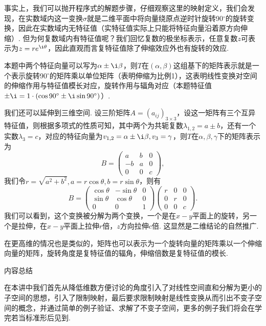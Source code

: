 事实上，我们可以抛开程序式的解题步骤，仔细观察这里的映射定义，我们会发现，在实数域内这一变换$\sigma$就是二维平面中将向量绕原点逆时针旋转90$^\circ$的旋转变换，因此在实数域内无特征值（实特征值实际上只能将特征向量沿着原方向伸缩）. 但为何复数域内有特征值呢？我们回忆复数的极坐标表示，任意复数$z$可表示为$z=re^{\i\theta}$，因此直观而言复特征值除了伸缩效应外也有旋转的效应.

本题中两个特征向量可以写为$\alpha\pm \i\beta$，则$T$在$(\alpha,\beta)$这组基下的矩阵表示就是一个表示旋转90$^\circ$的矩阵乘以单位矩阵（表明伸缩为比例1），这表明线性变换对空间的伸缩作用与特征值模长对应，旋转作用与辐角对应（本题特征值$\pm \i=1\cdot(\cos 90^\circ\pm \i\sin 90^\circ)$）.

我们还可以延伸到三维空间. 设三阶矩阵$A=(a_{ij})_{3\times 3}$，设这一矩阵有三个互异特征值，则根据多项式的性质可知，其中两个为共轭复数$\lambda_{1,2}=a\pm b$，还有一个实数$\lambda_3=c$，对应的特征向量为$v_{1,2}=\alpha\pm \i\beta,v_3=\gamma$，则$T$在$\alpha,\beta,\gamma$下的矩阵表示为
\[ B=\begin{pmatrix}
        a & b & 0 \\ -b & a & 0 \\ 0 & 0 & c
    \end{pmatrix}, \]
我们令$r=\sqrt{a^2+b^2},a=r\cos\theta,b=r\sin\theta$，则有
\[ B=\begin{pmatrix}
        \cos\theta & -\sin\theta & 0 \\ \sin\theta & \cos\theta & 0 \\ 0 & 0 & 1
    \end{pmatrix}\begin{pmatrix}
        r & 0 & 0 \\ 0 & r & 0 \\ 0 & 0 & c
    \end{pmatrix}. \]
我们可以看到，这个变换被分解为两个变换，一个是在$x-y$平面上的旋转，另一个是拉伸，在$x-y$平面上拉伸$r$倍，$z$方向拉伸$c$倍. 这显然是二维结论的自然推广.

在更高维的情况也是类似的，矩阵也可以表示为一个旋转向量的矩阵乘以一个伸缩向量的矩阵，旋转角度是复特征值的辐角，伸缩倍数是复特征值的模长.

\vspace{2ex}
\centerline{\heiti \Large 内容总结}

在本讲中我们首先从降低维数方便讨论的角度引入了对线性空间直和分解为更小的子空间的思想，引入了限制映射，最后要求限制映射是线性变换从而引出不变子空间的概念，并通过简单的例子验证、求解了不变子空间，更多的例子我们将会在学完若当标准形后见到.

